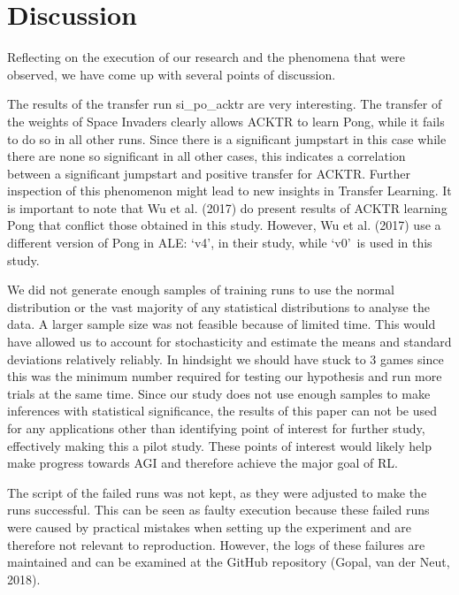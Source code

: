 \section{Discussion}
Reflecting on the execution of our research and the phenomena that were observed, we have come up with several points of discussion. 

The results of the transfer run si\_po\_acktr are very interesting. The transfer of the weights of Space Invaders clearly allows ACKTR to learn Pong, while it fails to do so in all other runs. Since there is a significant jumpstart in this case while there are none so significant in all other cases, this indicates a correlation between a significant jumpstart and positive transfer for ACKTR. Further inspection of this phenomenon might lead to new insights in Transfer Learning. It is important to note that Wu et al. (2017) do present results of ACKTR learning Pong that conflict those obtained in this study. However, Wu et al. (2017) use a different version of Pong in ALE: \lq v4\rq , in their study, while \lq v0\rq \ is used in this study. 

We did not generate enough samples of training runs to use the normal distribution or the vast majority of any statistical distributions to analyse the data. A larger sample size was not feasible because of limited time. This would have allowed us to account for stochasticity and estimate the means and standard deviations relatively reliably. In hindsight we should have stuck to 3 games since this was the minimum number required for testing our hypothesis and run more trials at the same time. Since our study does not use enough samples to make inferences with statistical significance, the results of this paper can not be used for any applications other than identifying point of interest for further study, effectively making this a pilot study. These points of interest would likely help make progress towards AGI and therefore achieve the major goal of RL.

The script of the failed runs was not kept, as they were adjusted to make the runs successful. This can be seen as faulty execution because these failed runs were caused by practical mistakes when setting up the experiment and are therefore not relevant to reproduction. However, the logs of these failures are maintained and can be examined at the GitHub repository (Gopal, van der Neut, 2018).

